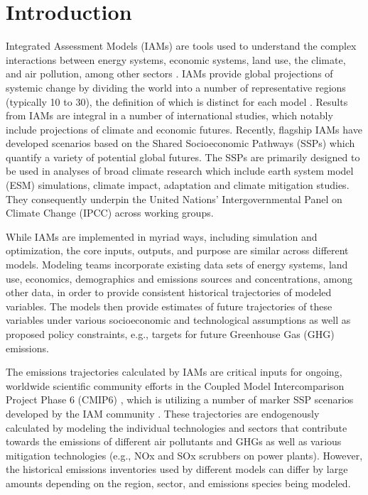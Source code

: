 \section{Introduction}

Integrated Assessment Models (IAMs) are tools used to understand the complex
interactions between energy systems, economic systems, land use, the climate,
and air pollution, among other sectors . IAMs provide global projections of
systemic change by dividing the world into a number of representative regions
(typically 10 to 30), the definition of which is distinct for each model
\cite{krey_global_2014}. Results from IAMs are integral in a number of
international studies, which notably include projections of climate and economic
futures. Recently, flagship IAMs have developed scenarios based on the Shared
Socioeconomic Pathways (SSPs) \cite{van_vuuren_energy_2017, fricko_marker_2017,
  fujimori_ssp3:_2017, calvin_ssp4:_2017, kriegler_fossil-fueled_2017} which
quantify a variety of potential global futures. The SSPs are primarily designed
to be used in analyses of broad climate research which include earth system
model (ESM) simulations, climate impact, adaptation and climate mitigation
studies. They consequently underpin the United Nations' Intergovernmental Panel
on Climate Change (IPCC) across working groups.

While IAMs are implemented in myriad ways, including simulation and
optimization, the core inputs, outputs, and purpose are similar across different
models. Modeling teams incorporate existing data sets of energy systems, land
use, economics, demographics and emissions sources and concentrations, among other
data, in order to provide consistent historical trajectories of modeled
variables. The models then provide estimates of future trajectories of these
variables under various socioeconomic and technological assumptions as well as
proposed policy constraints, e.g., targets for future Greenhouse Gas (GHG)
emissions.

The emissions trajectories calculated by IAMs are critical inputs for ongoing,
worldwide scientific community efforts in the Coupled Model Intercomparison
Project Phase 6 (CMIP6) \cite{eyring_overview_2016}, which is utilizing a number
of marker SSP scenarios developed by the IAM community
\cite{oneill_scenario_2016}. These trajectories are endogenously calculated by
modeling the individual technologies and sectors that contribute towards the
emissions of different air pollutants and GHGs as well as various mitigation
technologies (e.g., NOx and SOx scrubbers on power plants). However, the
historical emissions inventories used by different models can differ by large
amounts depending on the region, sector, and emissions species being modeled.

